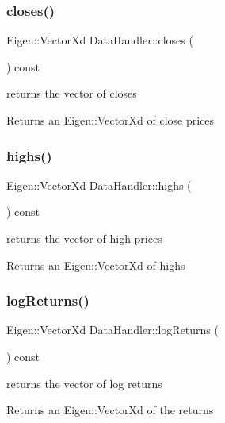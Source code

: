 \subsubsection{\texorpdfstring{closes()}{closes()}}
{\footnotesize\ttfamily Eigen\+::\+Vector\+Xd Data\+Handler\+::closes (\begin{DoxyParamCaption}{ }\end{DoxyParamCaption}) const}



returns the vector of closes 

\begin{DoxyReturn}{Returns}
an Eigen\+::\+Vector\+Xd of close prices 
\end{DoxyReturn}
\mbox{\label{classDataHandler_a94ccb9422f3f7d50ad07c3a0553baab9}} 
\subsubsection{\texorpdfstring{highs()}{highs()}}
{\footnotesize\ttfamily Eigen\+::\+Vector\+Xd Data\+Handler\+::highs (\begin{DoxyParamCaption}{ }\end{DoxyParamCaption}) const}



returns the vector of high prices 

\begin{DoxyReturn}{Returns}
an Eigen\+::\+Vector\+Xd of highs 
\end{DoxyReturn}
\mbox{\label{classDataHandler_aed9c495d5134beaf1c796d5f828de229}} 
\subsubsection{\texorpdfstring{log\+Returns()}{logReturns()}}
{\footnotesize\ttfamily Eigen\+::\+Vector\+Xd Data\+Handler\+::log\+Returns (\begin{DoxyParamCaption}{ }\end{DoxyParamCaption}) const}



returns the vector of log returns 

\begin{DoxyReturn}{Returns}
an Eigen\+::\+Vector\+Xd of the returns 
\end{DoxyReturn}
\mbox{\label{classDataHandler_ad0b44f8a121372a519922feea6dd02e4}} 
